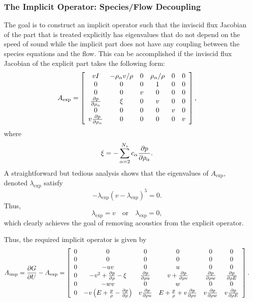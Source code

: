 \subsubsection{The Implicit Operator: Species/Flow Decoupling}
The goal is to construct an implicit operator such that the inviscid
flux Jacobian of the part that is treated explicitly has eigenvalues
that do not depend on the speed of sound while the implicit part does
not have any coupling between the species equations and the flow.
This can be accomplished if the inviscid flux Jacobian of the explicit
part takes the following form:
%
\begin{equation*}
A_{\mathrm{exp}} = \left[ \begin{array}{cccccc}
v I & -\rho_{\alpha} v / \rho & 0 & \rho_{\alpha} / \rho & 0 & 0 \\
0 & 0 & 0 & 1 & 0 & 0 \\
0 & 0 & v & 0 & 0 & 0 \\
\frac{\partial p}{\partial \rho_{\alpha}} & \xi & 0 & v  & 0 & 0 \\
0 & 0 & 0 & 0 & v & 0 \\
v \frac{\partial p}{\partial \rho_{\alpha}} & 0 & 0 & 0  & 0 & v 
\end{array} \right],
\end{equation*}
%
where
%
\begin{equation*}
\xi = -\sum_{\alpha=2}^{N_s} c_{\alpha} \frac{\partial p}{\partial \rho_{\alpha}}.
\end{equation*}
% 
A straightforward but tedious analysis shows that the eigenvalues of
$A_{\mathrm{exp}}$, denoted $\lambda_{\mathrm{exp}}$ satisfy
%
\begin{equation*}
-\lambda_{\exp} \left( v - \lambda_{\mathrm{exp}} \right)^5 = 0.
\end{equation*}
%
Thus,
%
\begin{equation*}
\lambda_{\mathrm{exp}} = v \quad \mathrm{or} \quad \lambda_{\mathrm{exp}} = 0,
\end{equation*}
% 
which clearly achieves the goal of removing acoustics from the
explicit operator.

Thus, the required implicit operator is given by
%
\begin{equation*}
A_{\mathrm{imp}} = \frac{\partial G}{\partial U} - A_{\mathrm{exp}} = \left[ \begin{array}{cccccc}
0 & 0 & 0 & 0 & 0 & 0 \\
0 & 0 & 0 & 0 & 0 & 0 \\
0 & -uv & 0 & u & 0 & 0 \\
0 & -v^2 +  \frac{\partial p}{\partial \rho} - \xi & \frac{\partial p}{\partial \rho u} & v + \frac{\partial p}{\partial \rho v} & \frac{\partial p}{\partial \rho w} & \frac{\partial p}{\partial \rho E} \\
0 & -wv & 0 & w & 0 & 0 \\
0 & -v \left(E + \frac{p}{\rho} - \frac{\partial p}{\partial \rho}\right) & v \frac{\partial p}{\partial \rho u} & E + \frac{p}{\rho} + v \frac{\partial p}{\partial \rho v}  & v \frac{\partial p}{\partial \rho w} & v \frac{\partial p}{\partial \rho E}
\end{array} \right].
\end{equation*}
%


